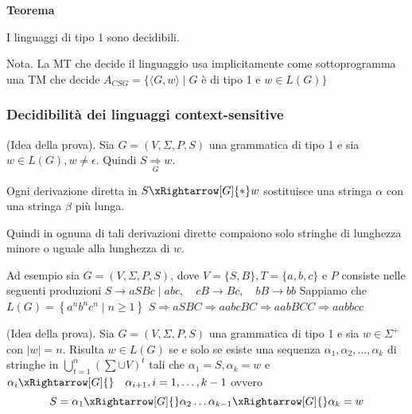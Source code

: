 \vspace{5mm}

\textbf{Teorema}

I linguaggi di tipo 1 sono decidibili.

Nota. La MT che decide il linguaggio usa implicitamente come sottoprogramma una TM che decide
$A_{C S G}=\{\langle G, w\rangle \mid G$ è di tipo 1 e $w \in L(G)\}$

\subsubsection{Decidibilità dei linguaggi context-sensitive}


(Idea della prova). Sia $G=(V, \Sigma, P, S)$ una grammatica di tipo 1 e sia $w \in L(G), w \neq \epsilon$. Quindi $S \underset{G}{\Rightarrow} w$.

Ogni derivazione diretta in $S \xRightarrow[G]{*} w$ sostituisce una stringa $\alpha$ con una stringa $\beta$ più lunga.

Quindi in ognuna di tali derivazioni dirette compaiono solo stringhe di lunghezza minore o uguale alla lunghezza di $w$.

\vspace{5mm}

Ad esempio sia $G=(V, \Sigma, P, S)$, dove $V=\{S, B\}, T=\{a, b, c\}$ e $P$ consiste nelle seguenti produzioni
$S \rightarrow a S B c \mid a b c, \quad c B \rightarrow B c, \quad b B \rightarrow b b$
Sappiamo che $L(G)=\left\{a^{n} b^{n} c^{n} \mid n \geq 1\right\}$
$S \Rightarrow a S B C \Rightarrow a a b c B C \Rightarrow a a b B C C \Rightarrow a a b b c c$

\vspace{5mm}

(Idea della prova). Sia $G=(V, \Sigma, P, S)$ una grammatica di tipo 1 e sia $w \in \Sigma^{+}$con $|w|=n$.
Risulta $w \in L(G)$ se e solo se esiste una sequenza $\alpha_{1}, \alpha_{2}, \ldots, \alpha_{k}$ di stringhe in $\bigcup_{t=1}^{n}\left(\sum \cup V\right)^{t}$ tali che $\alpha_{1}=S, \alpha_{k}=w$ e $\alpha_{i} \xRightarrow[G]{} \quad \alpha_{i+1}, i=1, \ldots, k-1$
ovvero
$$
S=\alpha_{1} \xRightarrow[G]{} \alpha_{2} \ldots \alpha_{k-1} \xRightarrow[G]{} \alpha_{k}=w
$$

\vspace{5mm}

